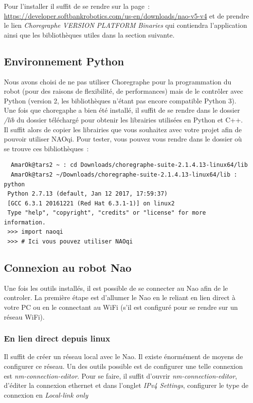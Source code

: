 \documentclass{article}
\begin{document}
Pour l'installer il suffit de se rendre sur la page~: \url{https://developer.softbankrobotics.com/us-en/downloads/nao-v5-v4} et de prendre le lien \emph{Choregraphe VERSION PLATFORM Binaries} qui contiendra l'application ainsi que les bibliothèques utiles dans la section suivante.

\subsection{Environnement Python}

Nous avons choisi de ne pas utiliser Choregraphe pour la programmation du robot (pour des raisons de flexibilité, de performances) mais de le contrôler avec Python (version 2, les bibliothèques n'étant pas encore compatible Python 3). Une fois que choregaphe a bien été installé, il suffit de se rendre dans le dossier \emph{/lib} du dossier téléchargé pour obtenir les librairies utilisées en Python et C++. Il suffit alors de copier les librairies que vous souhaitez avec votre projet afin de pouvoir utiliser NAOqi.
Pour tester, vous pouvez vous rendre dans le dossier où se trouve ces bibliothèques~:
\begin{verbatim}
  AmarOk@tars2 ~ : cd Downloads/choregraphe-suite-2.1.4.13-linux64/lib
  AmarOk@tars2 ~/Downloads/choregraphe-suite-2.1.4.13-linux64/lib : python
 Python 2.7.13 (default, Jan 12 2017, 17:59:37)
 [GCC 6.3.1 20161221 (Red Hat 6.3.1-1)] on linux2
 Type "help", "copyright", "credits" or "license" for more information.
 >>> import naoqi
 >>> # Ici vous pouvez utiliser NAOqi
\end{verbatim}

\subsection{Connexion au robot Nao}

Une fois les outils installés, il est possible de se connecter au Nao afin de le controler.
La première étape est d'allumer le Nao en le reliant en lien direct à votre PC ou en le connectant au WiFi (s'il est configuré pour se rendre sur un réseau WiFi).

\subsubsection{En lien direct depuis linux}

Il suffit de créer un réseau local avec le Nao. Il existe énormément de moyens de configurer ce réseau. Un des outils possible est de configurer une telle connexion est \emph{nm-connection-editor}. Pour se faire, il suffit d'ouvrir \emph{nm-connection-editor}, d'éditer la connexion ethernet et dans l'onglet \emph{IPv4 Settings}, configurer le type de connexion en \emph{Local-link only}
\end{document}
